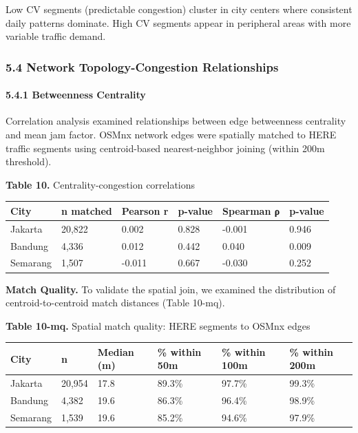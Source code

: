 Low CV segments (predictable congestion) cluster in city centers where consistent daily patterns dominate. High CV segments appear in peripheral areas with more variable traffic demand.

\subsubsection{5.4 Network Topology-Congestion Relationships}\label{network-topology-congestion-relationships}

\paragraph{5.4.1 Betweenness Centrality}\label{betweenness-centrality}

Correlation analysis examined relationships between edge betweenness centrality and mean jam factor. OSMnx network edges were spatially matched to HERE traffic segments using centroid-based nearest-neighbor joining (within 200m threshold).

\textbf{Table 10.} Centrality-congestion correlations

\begin{longtable}[]{@{}llllll@{}}
\toprule\noalign{}
City & n matched & Pearson r & p-value & Spearman ρ & p-value \\
\midrule\noalign{}
\endhead
\bottomrule\noalign{}
\endlastfoot
Jakarta & 20,822 & 0.002 & 0.828 & -0.001 & 0.946 \\
Bandung & 4,336 & 0.012 & 0.442 & 0.040 & 0.009 \\
Semarang & 1,507 & -0.011 & 0.667 & -0.030 & 0.252 \\
\end{longtable}

\textbf{Match Quality.} To validate the spatial join, we examined the distribution of centroid-to-centroid match distances (Table 10-mq).

\textbf{Table 10-mq.} Spatial match quality: HERE segments to OSMnx edges

\begin{longtable}[]{@{}llllll@{}}
\toprule\noalign{}
City & n & Median (m) & \% within 50m & \% within 100m & \% within 200m \\
\midrule\noalign{}
\endhead
\bottomrule\noalign{}
\endlastfoot
Jakarta & 20,954 & 17.8 & 89.3\% & 97.7\% & 99.3\% \\
Bandung & 4,382 & 19.6 & 86.3\% & 96.4\% & 98.9\% \\
Semarang & 1,539 & 19.6 & 85.2\% & 94.6\% & 97.9\% \\
\end{longtable}

